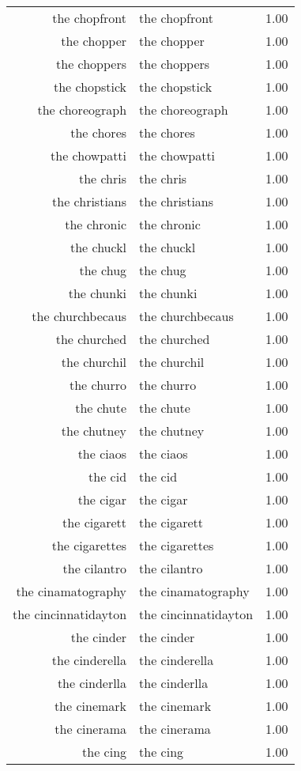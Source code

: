 \begin{table}[ht]
\begin{tabular}{rlr}
  the chopfront & the chopfront & 1.00 \\ 
  the chopper & the chopper & 1.00 \\ 
  the choppers & the choppers & 1.00 \\ 
  the chopstick & the chopstick & 1.00 \\ 
  the choreograph & the choreograph & 1.00 \\ 
  the chores & the chores & 1.00 \\ 
  the chowpatti & the chowpatti & 1.00 \\ 
  the chris & the chris & 1.00 \\ 
  the christians & the christians & 1.00 \\ 
  the chronic & the chronic & 1.00 \\ 
  the chuckl & the chuckl & 1.00 \\ 
  the chug & the chug & 1.00 \\ 
  the chunki & the chunki & 1.00 \\ 
  the churchbecaus & the churchbecaus & 1.00 \\ 
  the churched & the churched & 1.00 \\ 
  the churchil & the churchil & 1.00 \\ 
  the churro & the churro & 1.00 \\ 
  the chute & the chute & 1.00 \\ 
  the chutney & the chutney & 1.00 \\ 
  the ciaos & the ciaos & 1.00 \\ 
  the cid & the cid & 1.00 \\ 
  the cigar & the cigar & 1.00 \\ 
  the cigarett & the cigarett & 1.00 \\ 
  the cigarettes & the cigarettes & 1.00 \\ 
  the cilantro & the cilantro & 1.00 \\ 
  the cinamatography & the cinamatography & 1.00 \\ 
  the cincinnatidayton & the cincinnatidayton & 1.00 \\ 
  the cinder & the cinder & 1.00 \\ 
  the cinderella & the cinderella & 1.00 \\ 
  the cinderlla & the cinderlla & 1.00 \\ 
  the cinemark & the cinemark & 1.00 \\ 
  the cinerama & the cinerama & 1.00 \\ 
  the cing & the cing & 1.00 \\ 

\end{tabular}
\end{table}
